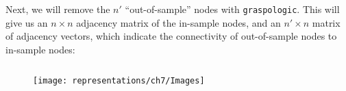 \begin{lstlisting}[style=python]

\end{lstlisting}

Next, we will remove the $n'$ ``out-of-sample'' nodes with \texttt{graspologic}. This will give us an $n \times n$ adjacency matrix of the in-sample nodes, and an $n' \times n$ matrix of adjacency vectors, which indicate the connectivity of out-of-sample nodes to in-sample nodes:

\begin{lstlisting}[style=python]

\end{lstlisting}



\begin{figure}[h]
    \centering
    \texttt{[image: representations/ch7/Images]}
    \caption{}
    \label{fig:ch7:comm_detect:ex}
\end{figure}



\begin{lstlisting}[style=python]

\end{lstlisting}

\begin{lstlisting}[style=python]

\end{lstlisting}

\begin{lstlisting}[style=python]

\end{lstlisting}


\newpage